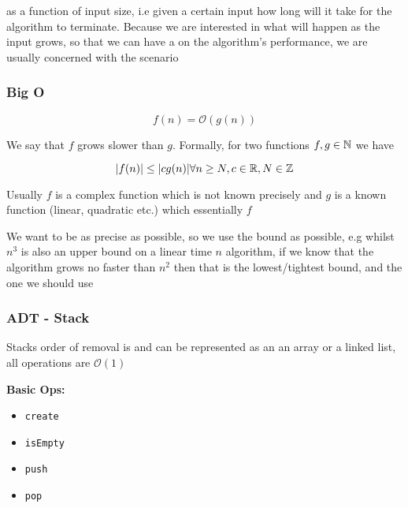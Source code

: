		\par{ as a function of input size, i.e given a certain input how long will it take for the algorithm to terminate. Because we are interested in what will happen as the input grows, so that we can have a  on the algorithm's performance, we are usually concerned with the  scenario}



		\subsubsection{Big O}

			$$f(n) = \mathcal{O}(g(n))$$

			\par{We say that $f$ grows  slower than $g$. Formally, for two functions $f, g \in \mathbb{N}$ we have }

			$$|f(n)| \leq |cg(n)| \forall n \geq N , c \in \mathbb{R} , N \in \mathbb{Z}$$


			\par{Usually $f$ is a complex function which is not known precisely and $g$ is a known function (linear, quadratic etc.) which essentially  $f$}

			\par{We want to be as precise as possible, so we use the  bound as possible, e.g whilst $n^3$ is also an upper bound on a linear time $n$ algorithm, if we know that the algorithm grows no faster than $n^2$ then that is the lowest/tightest bound, and the one we should use}

	\subsubsection{ADT - Stack}

		\par{Stacks order of removal is  and can be represented as an an array or a linked list, all operations are $\mathcal{O}(1)$}

		\par{\textbf{Basic Ops:}}
			\begin{itemize}
				\item \texttt{create}
				\item \texttt{isEmpty}
				\item \texttt{push}
				\item \texttt{pop}
			\end{itemize}



